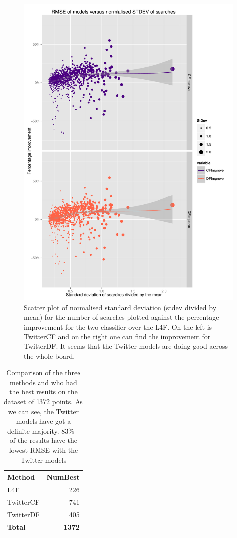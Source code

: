 \documentclass[minf,twoside,singlespacing,parskip,frontabs]{infthesis}
\begin{document}
\begin{figure}[]
\begin{center}
\includegraphics[scale=0.75]{rmse-nstdev}
\end{center}
\caption{Scatter plot of normalised standard deviation (stdev divided by mean) for the number of searches plotted against the percentage improvement for the two classifier over the L4F. On the left is TwitterCF and on the right one can find the improvement for TwitterDF. It seems that the Twitter models are doing good across the whole board.}
\label{rmse-nstdev}
\end{figure}


\begin{table}[h]
\begin{center}
\begin{tabular}{ l | r }
Method & NumBest \\
\hline
L4F & 226 \\
TwitterCF & 741 \\
TwitterDF & 405 \\
\hline
\textbf{Total} & \textbf{1372}
\end{tabular}
\end{center}
\caption{Comparison of the three methods and who had the best results on the dataset of 1372 points. As we can see, the Twitter models have got a definite majority. 83\%+ of the results have the lowest RMSE with the Twitter models}
\label{comparison-all}
\end{table}
\end{document}
